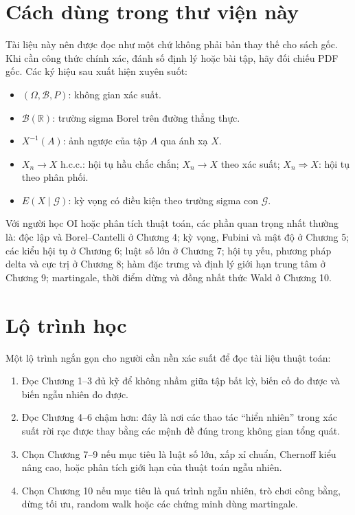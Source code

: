 \documentclass[11pt]{article}
\begin{document}
\section{Cách dùng trong thư viện này}

Tài liệu này nên được đọc như một  chứ không phải bản
thay thế cho sách gốc. Khi cần công thức chính xác, đánh số định lý hoặc bài
tập, hãy đối chiếu PDF gốc. Các ký hiệu sau xuất hiện xuyên suốt:
\begin{itemize}
  \item \((\Omega,\mathcal{B},P)\): không gian xác suất.
  \item \(\mathcal{B}(\mathbb{R})\): trường sigma Borel trên đường thẳng thực.
  \item \(X^{-1}(A)\): ảnh ngược của tập \(A\) qua ánh xạ \(X\).
  \item \(X_n \to X\) h.c.c.: hội tụ hầu chắc chắn; \(X_n \to X\) theo xác
        suất; \(X_n \Rightarrow X\): hội tụ theo phân phối.
  \item \(E(X\mid\mathcal{G})\): kỳ vọng có điều kiện theo trường sigma con
        \(\mathcal{G}\).
\end{itemize}

Với người học OI hoặc phân tích thuật toán, các phần quan trọng nhất thường là:
độc lập và Borel--Cantelli ở Chương 4; kỳ vọng, Fubini và mật độ ở Chương 5;
các kiểu hội tụ ở Chương 6; luật số lớn ở Chương 7; hội tụ yếu, phương pháp
delta và cực trị ở Chương 8; hàm đặc trưng và định lý giới hạn trung tâm ở
Chương 9; martingale, thời điểm dừng và đồng nhất thức Wald ở Chương 10.

\section{Lộ trình học}

Một lộ trình ngắn gọn cho người cần nền xác suất để đọc tài liệu thuật toán:
\begin{enumerate}
  \item Đọc Chương 1--3 đủ kỹ để không nhầm giữa tập bất kỳ, biến cố đo được
        và biến ngẫu nhiên đo được.
  \item Đọc Chương 4--6 chậm hơn: đây là nơi các thao tác ``hiển nhiên'' trong
        xác suất rời rạc được thay bằng các mệnh đề đúng trong không gian tổng
        quát.
  \item Chọn Chương 7--9 nếu mục tiêu là luật số lớn, xấp xỉ chuẩn, Chernoff
        kiểu nâng cao, hoặc phân tích giới hạn của thuật toán ngẫu nhiên.
  \item Chọn Chương 10 nếu mục tiêu là quá trình ngẫu nhiên, trò chơi công
        bằng, dừng tối ưu, random walk hoặc các chứng minh dùng martingale.
\end{enumerate}
\end{document}
